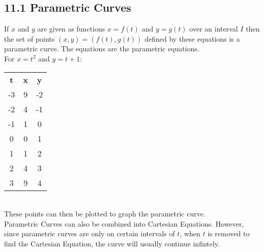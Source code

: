 \documentclass{article}
\begin{document}
        \subsection*{11.1 Parametric Curves}
            If $x$ and $y$ are given as functions $x=f(t)$ and $y=g(t)$ over an interval $I$ then the set of points $(x, y) = (f(t), g(t))$ defined by these equations is a parametric curve. The equations are the parametric equations. \\
            For $x=t^2$ and $y=t+1$: \\
            \begin{tabular}{ c c c }
                \textbf{t} & \textbf{x} & \textbf{y} \\
                -3 & 9 & -2 \\
                -2 & 4 & -1 \\
                -1 & 1 &  0 \\
                 0 & 0 &  1 \\
                 1 & 1 &  2 \\
                 2 & 4 &  3 \\
                 3 & 9 &  4 \\
            \end{tabular}
            \\
            These points can then be plotted to graph the parametric curve. \\
            Parametric Curves can also be combined into Cartesian Equations. However, since parametric curves are only on certain intervals of $t$, when $t$ is removed to find the Cartesian Equation, the curve will usually continue infintely. \\
        \color{JungleGreen}
\end{document}
